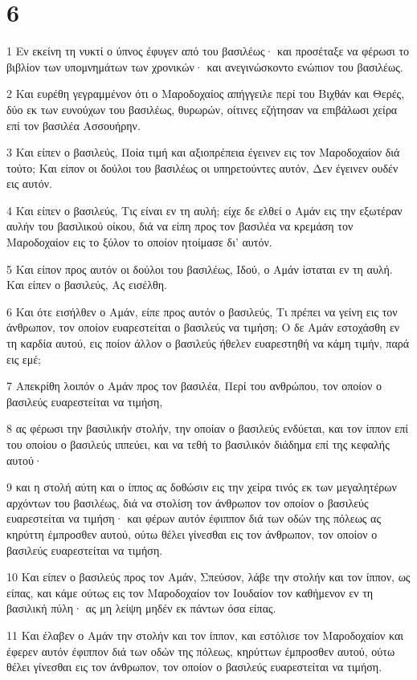 \chapter{6}

\par 1 Εν εκείνη τη νυκτί ο ύπνος έφυγεν από του βασιλέως· και προσέταξε να φέρωσι το βιβλίον των υπομνημάτων των χρονικών· και ανεγινώσκοντο ενώπιον του βασιλέως.
\par 2 Και ευρέθη γεγραμμένον ότι ο Μαροδοχαίος απήγγειλε περί του Βιχθάν και Θερές, δύο εκ των ευνούχων του βασιλέως, θυρωρών, οίτινες εζήτησαν να επιβάλωσι χείρα επί τον βασιλέα Ασσουήρην.
\par 3 Και είπεν ο βασιλεύς, Ποία τιμή και αξιοπρέπεια έγεινεν εις τον Μαροδοχαίον διά τούτο; Και είπον οι δούλοι του βασιλέως οι υπηρετούντες αυτόν, Δεν έγεινεν ουδέν εις αυτόν.
\par 4 Και είπεν ο βασιλεύς, Τις είναι εν τη αυλή; είχε δε ελθεί ο Αμάν εις την εξωτέραν αυλήν του βασιλικού οίκου, διά να είπη προς τον βασιλέα να κρεμάση τον Μαροδοχαίον εις το ξύλον το οποίον ητοίμασε δι' αυτόν.
\par 5 Και είπον προς αυτόν οι δούλοι του βασιλέως, Ιδού, ο Αμάν ίσταται εν τη αυλή. Και είπεν ο βασιλεύς, Ας εισέλθη.
\par 6 Και ότε εισήλθεν ο Αμάν, είπε προς αυτόν ο βασιλεύς, Τι πρέπει να γείνη εις τον άνθρωπον, τον οποίον ευαρεστείται ο βασιλεύς να τιμήση; Ο δε Αμάν εστοχάσθη εν τη καρδία αυτού, εις ποίον άλλον ο βασιλεύς ήθελεν ευαρεστηθή να κάμη τιμήν, παρά εις εμέ;
\par 7 Απεκρίθη λοιπόν ο Αμάν προς τον βασιλέα, Περί του ανθρώπου, τον οποίον ο βασιλεύς ευαρεστείται να τιμήση,
\par 8 ας φέρωσι την βασιλικήν στολήν, την οποίαν ο βασιλεύς ενδύεται, και τον ίππον επί του οποίου ο βασιλεύς ιππεύει, και να τεθή το βασιλικόν διάδημα επί της κεφαλής αυτού·
\par 9 και η στολή αύτη και ο ίππος ας δοθώσιν εις την χείρα τινός εκ των μεγαλητέρων αρχόντων του βασιλέως, διά να στολίση τον άνθρωπον τον οποίον ο βασιλεύς ευαρεστείται να τιμήση· και φέρων αυτόν έφιππον διά των οδών της πόλεως ας κηρύττη έμπροσθεν αυτού, ούτω θέλει γίνεσθαι εις τον άνθρωπον, τον οποίον ο βασιλεύς ευαρεστείται να τιμήση.
\par 10 Και είπεν ο βασιλεύς προς τον Αμάν, Σπεύσον, λάβε την στολήν και τον ίππον, ως είπας, και κάμε ούτως εις τον Μαροδοχαίον τον Ιουδαίον τον καθήμενον εν τη βασιλική πύλη· ας μη λείψη μηδέν εκ πάντων όσα είπας.
\par 11 Και έλαβεν ο Αμάν την στολήν και τον ίππον, και εστόλισε τον Μαροδοχαίον και έφερεν αυτόν έφιππον διά των οδών της πόλεως, κηρύττων έμπροσθεν αυτού, ούτω θέλει γίνεσθαι εις τον άνθρωπον, τον οποίον ο βασιλεύς ευαρεστείται να τιμήση.
